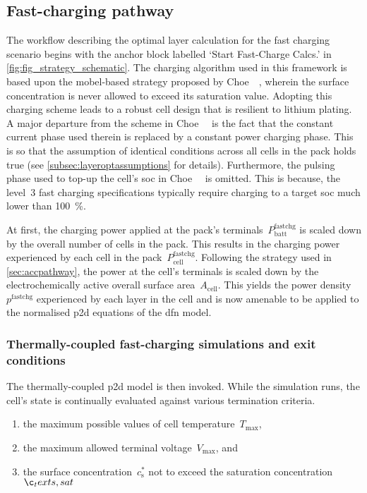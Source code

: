 \subsection{Fast-charging pathway}

The  workflow describing  the optimal  layer calculation  for the  fast charging
scenario begins  with the  anchor block labelled  `Start Fast-Charge  Calcs.' in
\cref{fig:fig_strategy_schematic}. The charging algorithm used in this framework
is based  upon the mobel-based strategy  proposed by Choe~\etal~\cite{Choe2013},
wherein  the surface  concentration is  never allowed  to exceed  its saturation
value.  Adopting  this charging  scheme  leads  to  a  robust cell  design  that
is  resilient  to  lithium  plating.  A  major  departure  from  the  scheme  in
Choe~\etal~\cite{Choe2013}  is the  fact that  the constant  current phase  used
therein is  replaced by  a constant power  charging phase. This  is so  that the
assumption of identical conditions across all  cells in the pack holds true (see
\cref{subsec:layeroptassumptions} for  details). Furthermore, the  pulsing phase
used to  top-up the cell's  \gls{soc} in Choe~\etal~\cite{Choe2013}  is omitted.
This  is because,  the level~3  fast charging  specifications typically  require
charging to a target \gls{soc} much lower than \SI{100}{\percent}.

At     first,     the    charging     power     applied     at    the     pack's
terminals~$P_\text{batt}^\text{fastchg}$ is scaled down by the overall number of
cells in the pack.  This results in the charging power  experienced by each cell
in  the  pack~$P_\text{cell}^\text{fastchg}$.  Following the  strategy  used  in
\cref{sec:accpathway}, the power  at the cell's terminals is scaled  down by the
electrochemically active  overall surface area~$A_\text{cell}$. This  yields the
power density~$p^{\text{fastchg}}$ experienced by each  layer in the cell and is
now  amenable  to be  applied  to  the  normalised  \gls{p2d} equations  of  the
\gls{dfn} model.

\subsubsection*{Thermally-coupled fast-charging simulations and exit conditions}

The thermally-coupled \gls{p2d} model is then invoked. While the simulation
runs, the cell's state is continually evaluated against various termination
criteria.
\begin{enumerate}
    \item the maximum possible values of cell temperature~$T_\text{max}$,
    \item the maximum allowed terminal voltage~$V_\text{max}$, and
    \item the surface concentration~$c_\text{s}^{\ast}$ not to exceed the saturation concentration~$\c_text{s,sat}$
\end{enumerate}

